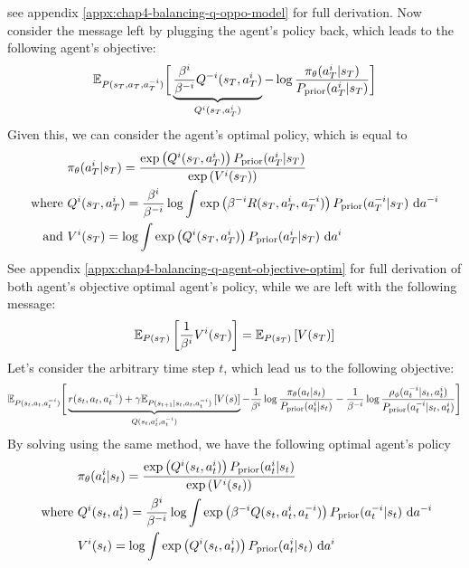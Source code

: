 see appendix \ref{appx:chap4-balancing-q-oppo-model} for full derivation. Now consider the message left by plugging the agent's policy back, which leads to the following agent's objective:
\begin{equation}
    \mathbb{E}_{P(s_T, a_T, a^{-i}_T)}\bigg[ \underbrace{\frac{\beta^i}{\beta^{-i}} Q^{-i}(s_T, a^{i}_T)}_{Q^i(s_T, a^{i}_T)} - \log\frac{\pi_{\theta}(a^i_T|s_T)}{P_{\text{prior}}(a^i_T|s_T)}\bigg]
\end{equation}
Given this, we can consider the agent's optimal policy, which is equal to 
\begin{equation}
\begin{aligned}
    &\pi_{\theta}(a^i_T|s_T) = \frac{ \exp\left( Q^i(s_T, a^{i}_T) \right)P_{\text{prior}}(a^i_T|s_T)} {\exp\left( V^i(s_T) \right)} \\
    \text{where }& Q^i(s_T, a^{i}_T) = \frac{\beta^i}{\beta^{-i}} \log \int \exp\left( \beta^{-i} R(s_T, a^i_T, a^{-i}_T) \right) P_{\text{prior}}(a^{-i}_T|s_T) \ \mathrm{d} a^{-i} \\
    \text{and }& V^i(s_T) = \log \int  \exp\left( Q^i(s_T, a^{i}_T) \right)P_{\text{prior}}(a^i_T|s_T) \ \mathrm{d} a^i
\end{aligned}
\end{equation}
See appendix \ref{appx:chap4-balancing-q-agent-objective-optim} for full derivation of both agent's objective optimal agent's policy, while we are left with the following message:
\begin{equation}
    \mathbb{E}_{P(s_T)}\left[ \frac{1}{\beta^i}V^i(s_T) \right] = \mathbb{E}_{P(s_T)}\left[ V(s_T) \right]
\end{equation}
Let's consider the arbitrary time step $t$, which lead us to the following objective:
\begin{equation}
    \mathbb{E}_{P(s_t, a_t, a^{-i}_t)}\Bigg[ \underbrace{r(s_t, a_t, a^{-i}_t) + \gamma\mathbb{E}_{P(s_{t+1} | s_t, a_t, a^{-i}_t)}\left[ V(s) \right]}_{Q(s_t, a^i_t, a^{-i}_t)} - \frac{1}{\beta^i} \log\frac{\pi_{\theta}(a_t|s_t)}{P_{\text{prior}}(a^i_t|s_t)} - \frac{1}{\beta^{-i}}\log \frac{\rho_\phi(a^{-i}_t | s_t, a^i_t)}{P_{\text{prior}}(a^{-i}_t | s_t, a^i_t)} \Bigg]
\end{equation}
By solving using the same method, we have the following optimal agent's policy
\begin{equation}
\begin{aligned}
    &\pi_{\theta}(a^i_t|s_t) = \frac{ \exp\left( Q^i(s_t, a^{i}_t) \right)P_{\text{prior}}(a^i_t|s_t)} {\exp\left( V^i(s_t) \right)} \\
    \text{ where }
    &Q^{i}(s_t, a^{i}_t) = \frac{\beta^i}{\beta^{-i}} \log \int \exp\left( \beta^{-i} Q(s_t, a^i_t, a^{-i}_t) \right) P_{\text{prior}}(a^{-i}_t|s_t) \ \mathrm{d} a^{-i} \\
    &V^{i}(s_t) = \log \int  \exp\left( Q^i(s_t, a^{i}_t) \right)P_{\text{prior}}(a^i_t|s_t) \ \mathrm{d} a^i\\
\end{aligned}
\end{equation}
